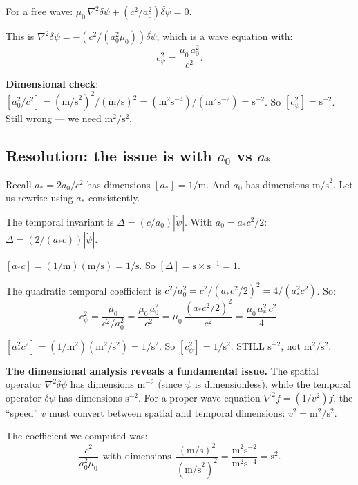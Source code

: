 \documentclass[11pt]{article}
\begin{document}
For a free wave: $\mu_0\,\nabla^2\delta\psi + (c^2/a_0^2)\ddot{\delta\psi} = 0$.

This is $\nabla^2\delta\psi = -(c^2/(a_0^2\mu_0))\ddot{\delta\psi}$,
which is a wave equation with:
\begin{equation}
c_\psi^2 = \frac{\mu_0\,a_0^2}{c^2}.
\end{equation}

\textbf{Dimensional check}: $[a_0^2/c^2] = (\text{m/s}^2)^2/(\text{m/s})^2
= (\text{m}^2\text{s}^{-4})/(\text{m}^2\text{s}^{-2}) = \text{s}^{-2}$.
So $[c_\psi^2] = \text{s}^{-2}$. Still wrong --- we need $\text{m}^2/\text{s}^2$.

\subsection{Resolution: the issue is with $a_0$ vs $a_*$}

Recall $a_* = 2a_0/c^2$ has dimensions $[a_*] = 1/\text{m}$.
And $a_0$ has dimensions $\text{m/s}^2$. Let us rewrite using $a_*$ consistently.

The temporal invariant is $\Delta = (c/a_0)|\dot\psi|$. With $a_0 = a_* c^2/2$:
$\Delta = (2/(a_* c))|\dot\psi|$.

$[a_* c] = (1/\text{m})(\text{m/s}) = 1/\text{s}$. So
$[\Delta] = \text{s} \times \text{s}^{-1} = 1$. \checkmark

The quadratic temporal coefficient is $c^2/a_0^2 = c^2/(a_*c^2/2)^2
= 4/(a_*^2 c^2)$. So:
\begin{equation}
c_\psi^2 = \frac{\mu_0}{c^2/a_0^2} = \frac{\mu_0\,a_0^2}{c^2}
= \mu_0\,\frac{(a_*c^2/2)^2}{c^2} = \frac{\mu_0\,a_*^2\,c^2}{4}.
\end{equation}

$[a_*^2 c^2] = (1/\text{m}^2)(\text{m}^2/\text{s}^2) = 1/\text{s}^2$.
So $[c_\psi^2] = 1/\text{s}^2$. STILL $\text{s}^{-2}$, not
$\text{m}^2/\text{s}^2$.

\textbf{The dimensional analysis reveals a fundamental issue.} The
spatial operator $\nabla^2\delta\psi$ has dimensions $\text{m}^{-2}$
(since $\psi$ is dimensionless), while the temporal operator
$\ddot{\delta\psi}$ has dimensions $\text{s}^{-2}$. For a proper
wave equation $\nabla^2 f = (1/v^2)\ddot f$, the ``speed'' $v$ must
convert between spatial and temporal dimensions: $v^2 = \text{m}^2/\text{s}^2$.

The coefficient we computed was:
\begin{equation}
\frac{c^2}{a_0^2\mu_0}~~\text{with dimensions}~~\frac{(\text{m/s})^2}{(\text{m/s}^2)^2}
= \frac{\text{m}^2\text{s}^{-2}}{\text{m}^2\text{s}^{-4}} = \text{s}^2.
\end{equation}
\end{document}
